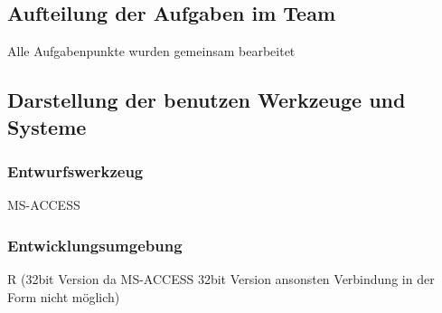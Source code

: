 \subsection*{Aufteilung der Aufgaben im Team}
Alle Aufgabenpunkte wurden gemeinsam bearbeitet
\subsection*{Darstellung der benutzen Werkzeuge und Systeme}
\subsubsection*{Entwurfswerkzeug}
MS-ACCESS
\subsubsection*{Entwicklungsumgebung}
R (32bit Version da MS-ACCESS 32bit Version ansonsten Verbindung in der Form nicht möglich)

